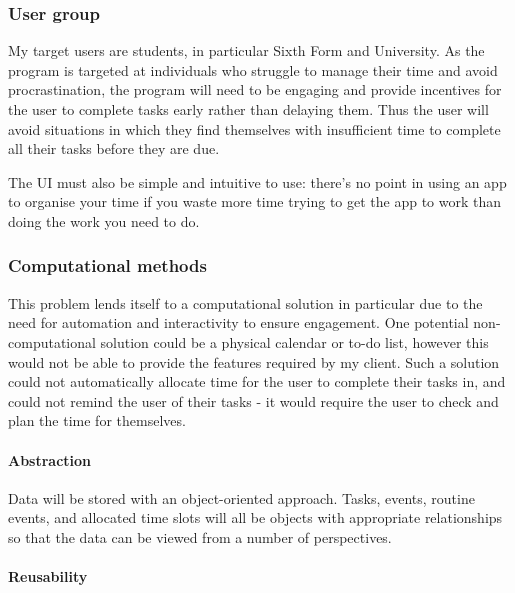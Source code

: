 \documentclass[]{article}
\let\oldparagraph\paragraph
\renewcommand{\paragraph}[1]{\oldparagraph{#1}\mbox{}}
\begin{document}
\hypertarget{user-group}{%
\subsubsection{User group}\label{user-group}}

My target users are students, in particular Sixth Form and University.
As the program is targeted at individuals who struggle to manage their
time and avoid procrastination, the program will need to be engaging and
provide incentives for the user to complete tasks early rather than
delaying them. Thus the user will avoid situations in which they find
themselves with insufficient time to complete all their tasks before
they are due.

The UI must also be simple and intuitive to use: there's no point in
using an app to organise your time if you waste more time trying to get
the app to work than doing the work you need to do.

\hypertarget{computational-methods}{%
\subsubsection{Computational methods}\label{computational-methods}}

This problem lends itself to a computational solution in particular due
to the need for automation and interactivity to ensure engagement. One
potential non-computational solution could be a physical calendar or
to-do list, however this would not be able to provide the features
required by my client. Such a solution could not automatically allocate
time for the user to complete their tasks in, and could not remind the
user of their tasks - it would require the user to check and plan the
time for themselves.

\hypertarget{abstraction}{%
\paragraph{Abstraction}\label{abstraction}}

Data will be stored with an object-oriented approach. Tasks, events,
routine events, and allocated time slots will all be objects with
appropriate relationships so that the data can be viewed from a number
of perspectives.

\hypertarget{reusability}{%
\paragraph{Reusability}\label{reusability}}
\end{document}
